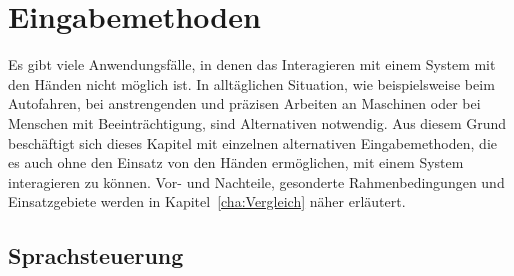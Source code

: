 \chapter{Eingabemethoden}
\label{cha:Eingabe}

Es gibt viele Anwendungsfälle, in denen das Interagieren mit einem System mit den Händen nicht möglich ist. In alltäglichen Situation, wie beispielsweise beim Autofahren, bei anstrengenden und präzisen Arbeiten an Maschinen oder bei Menschen mit Beeinträchtigung, sind Alternativen notwendig. Aus diesem Grund beschäftigt sich dieses Kapitel mit einzelnen alternativen Eingabemethoden, die es auch ohne den Einsatz von den Händen ermöglichen, mit einem System interagieren zu können. Vor- und Nachteile, gesonderte Rahmenbedingungen und Einsatzgebiete werden in Kapitel~\ref{cha:Vergleich} näher erläutert. 

\section{Sprachsteuerung}

